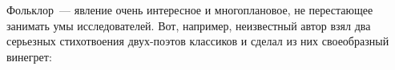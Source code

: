 \documentclass[oneside,final]{extreport}
\begin{document}
Фольклор~--- явление очень интересное и многоплановое, не перестающее занимать умы исследователей. Вот, например, неизвестный автор взял два серьезных стихотвоения двух-поэтов классиков и сделал из них своеобразный винегрет: 
\bigskip
\end{document}

